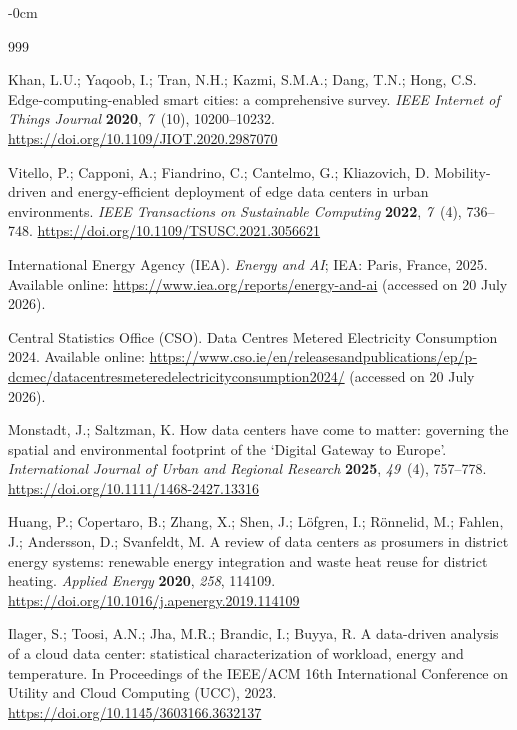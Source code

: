 \documentclass[smartcities,article,submit,moreauthors]{Definitions/mdpi}
\begin{document}
\begin{adjustwidth}{-\extralength}{0cm}


\begin{thebibliography}{999}

Khan, L.U.; Yaqoob, I.; Tran, N.H.; Kazmi, S.M.A.; Dang, T.N.; Hong, C.S.
Edge-computing-enabled smart cities: a comprehensive survey. \emph{IEEE
Internet of Things Journal} \textbf{2020}, \emph{7}~(10), 10200--10232.
\url{https://doi.org/10.1109/JIOT.2020.2987070}

Vitello, P.; Capponi, A.; Fiandrino, C.; Cantelmo, G.; Kliazovich, D.
Mobility-driven and energy-efficient deployment of edge data centers in urban
environments. \emph{IEEE Transactions on Sustainable Computing} \textbf{2022},
\emph{7}~(4), 736--748.
\url{https://doi.org/10.1109/TSUSC.2021.3056621}

International Energy Agency (IEA). \emph{Energy and AI}; IEA: Paris, France,
2025. Available online: \url{https://www.iea.org/reports/energy-and-ai}
(accessed on 20 July 2026).

Central Statistics Office (CSO). Data Centres Metered Electricity Consumption
2024. Available online:
\url{https://www.cso.ie/en/releasesandpublications/ep/p-dcmec/datacentresmeteredelectricityconsumption2024/}
(accessed on 20 July 2026).

Monstadt, J.; Saltzman, K. How data centers have come to matter: governing the
spatial and environmental footprint of the `Digital Gateway to Europe'.
\emph{International Journal of Urban and Regional Research} \textbf{2025},
\emph{49}~(4), 757--778.
\url{https://doi.org/10.1111/1468-2427.13316}

Huang, P.; Copertaro, B.; Zhang, X.; Shen, J.; L\"ofgren, I.; R\"onnelid, M.;
Fahlen, J.; Andersson, D.; Svanfeldt, M. A review of data centers as prosumers
in district energy systems: renewable energy integration and waste heat reuse
for district heating. \emph{Applied Energy} \textbf{2020}, \emph{258}, 114109.
\url{https://doi.org/10.1016/j.apenergy.2019.114109}

Ilager, S.; Toosi, A.N.; Jha, M.R.; Brandic, I.; Buyya, R. A data-driven
analysis of a cloud data center: statistical characterization of workload,
energy and temperature. In Proceedings of the IEEE/ACM 16th International
Conference on Utility and Cloud Computing (UCC), 2023.
\url{https://doi.org/10.1145/3603166.3632137}


\end{thebibliography}
\end{adjustwidth}
\end{document}
